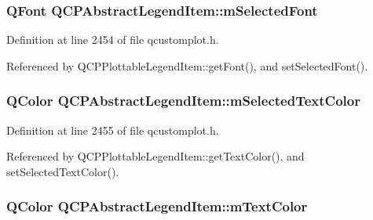 \subsubsection[{m\+Selected\+Font}]{\setlength{\rightskip}{0pt plus 5cm}Q\+Font Q\+C\+P\+Abstract\+Legend\+Item\+::m\+Selected\+Font\hspace{0.3cm}{\ttfamily [protected]}}\label{class_q_c_p_abstract_legend_item_ab971df604306b192875a7d097feb1e21}


Definition at line 2454 of file qcustomplot.\+h.



Referenced by Q\+C\+P\+Plottable\+Legend\+Item\+::get\+Font(), and set\+Selected\+Font().

\hypertarget{class_q_c_p_abstract_legend_item_a4965c13854d970b24c284f0a4f005fbd}{}
\subsubsection[{m\+Selected\+Text\+Color}]{\setlength{\rightskip}{0pt plus 5cm}Q\+Color Q\+C\+P\+Abstract\+Legend\+Item\+::m\+Selected\+Text\+Color\hspace{0.3cm}{\ttfamily [protected]}}\label{class_q_c_p_abstract_legend_item_a4965c13854d970b24c284f0a4f005fbd}


Definition at line 2455 of file qcustomplot.\+h.



Referenced by Q\+C\+P\+Plottable\+Legend\+Item\+::get\+Text\+Color(), and set\+Selected\+Text\+Color().

\hypertarget{class_q_c_p_abstract_legend_item_a974b21e9930227d281344bd2242d289d}{}
\subsubsection[{m\+Text\+Color}]{\setlength{\rightskip}{0pt plus 5cm}Q\+Color Q\+C\+P\+Abstract\+Legend\+Item\+::m\+Text\+Color\hspace{0.3cm}{\ttfamily [protected]}}\label{class_q_c_p_abstract_legend_item_a974b21e9930227d281344bd2242d289d}


